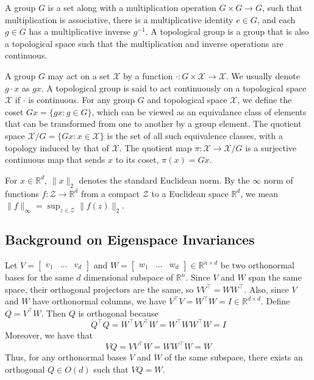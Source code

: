 \documentclass{article} \usepackage{iclr2023_conference,times}
\newcommand{\RR}{\mathbb R}
\newcommand{\mc}[1]{\mathcal{#1}}
\newcommand\norm[1]{\lVert#1\rVert}
\begin{document}
A group $G$ is a set along with a multiplication operation $G \times G \to G$, such that multiplication is associative, there is a multiplicative identity $e \in G$, and each $g \in G$ has a multiplicative inverse $g^{-1}$. A topological group is a group that is also a topological space such that the multiplication and inverse operations are continuous.

A group $G$ may act on a set $\mc X$ by a function $\cdot: G \times \mc X \to \mc X$. We usually denote $g \cdot x$ as $gx$. A topological group is said to act continuously on a topological space $\mc X$ if $\cdot$ is continuous. For any group $G$ and topological space $\mc X$, we define the coset $Gx = \{ gx : g \in G\}$, which can be viewed as an equivalance class of elements that can be transformed from one to another by a group element. The quotient space $\mc X / G = \{Gx : x \in \mc X \}$ is the set of all such equivalence classes, with a topology induced by that of $\mc X$. The quotient map $\pi : \mc X \to \mc X / G$ is a surjective continuous map that sends $x$ to its coset, $\pi(x) = Gx$.

For $x \in \RR^d$, $\norm{x}_2$ denotes the standard Euclidean norm. By the $\infty$ norm of functions $f: \mc Z  \to \RR^d$ from a compact $\mc Z$ to a Euclidean space $\RR^d$, we mean $\norm{f}_\infty = \sup_{z \in \mc Z} \norm{f(z)}_2$.

\subsection{Background on Eigenspace Invariances}\label{appendix:eigenspace_background}

 Let $V = \begin{bmatrix} v_1 & \ldots & v_d \end{bmatrix}$ and $W = \begin{bmatrix} w_1 & \ldots & w_d \end{bmatrix} \in \RR^{n \times d}$ be two orthonormal bases for the same $d$ dimensional subspace of $\RR^n$. Since $V$ and $W$ span the same space, their orthogonal projectors are the same, so $VV^\top = WW^\top$. Also, since $V$ and $W$ have orthonormal columns, we have $V^\top V = W^\top W = I \in \RR^{d \times d}$. Define $Q = V^\top W$. Then $Q$ is orthogonal because
 \begin{equation}
     Q^\top Q = W^\top VV^\top W = W^\top WW^\top W = I
 \end{equation}
 Moreover, we have that
 \begin{equation}
     VQ = VV^\top W = WW^\top W = W
 \end{equation}
 Thus, for any orthonormal bases $V$ and $W$ of the same subspace, there exists an orthogonal $Q \in O(d)$ such that $VQ = W$.
\end{document}
